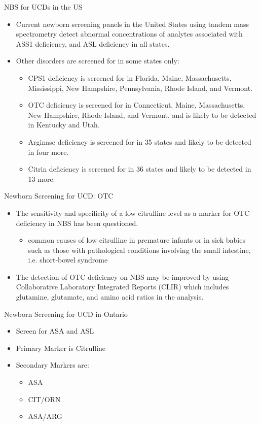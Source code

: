 \documentclass[presentation, smaller]{beamer}
\begin{document}
\begin{frame}[label={sec:orgheadline12}]{NBS for UCDs in the US}
\begin{itemize}
\item Current newborn screening panels in the United States using tandem
mass spectrometry detect abnormal concentrations of analytes
associated with ASS1 deficiency, and ASL deficiency in all states.

\item Other disorders are screened for in some states only:
\begin{itemize}
\item CPS1 deficiency is screened for in Florida, Maine, Massachusetts,
Mississippi, New Hampshire, Pennsylvania, Rhode Island, and
Vermont.
\item OTC deficiency is screened for in Connecticut, Maine,
Massachusetts, New Hampshire, Rhode Island, and Vermont, and is
likely to be detected in Kentucky and Utah.
\item Arginase deficiency is screened for in 35 states and likely to be
detected in four more.
\item Citrin deficiency is screened for in 36 states and likely to be
detected in 13 more.
\end{itemize}
\end{itemize}
\end{frame}

\begin{frame}[label={sec:orgheadline13}]{Newborn Screening for UCD: OTC}
\begin{itemize}
\item The sensitivity and specificity of a low citrulline level as a
marker for OTC deficiency in NBS has been questioned.
\begin{itemize}
\item common causes of low citrulline in premature infants or in sick
babies such as those with pathological conditions involving the
small intestine, i.e. short-bowel syndrome
\end{itemize}
\item The detection of OTC deficiency on NBS may be improved by using
Collaborative Laboratory Integrated Reports (CLIR) which includes
glutamine, glutamate, and amino acid ratios in the analysis.
\end{itemize}
\end{frame}

\begin{frame}[label={sec:orgheadline14}]{Newborn Screening for UCD in Ontario}
\begin{itemize}
\item Screen for ASA and ASL
\item Primary Marker is Citrulline
\item Secondary Markers are:
\begin{itemize}
\item ASA
\item CIT/ORN
\item ASA/ARG
\end{itemize}
\end{itemize}
\end{frame}
\end{document}
